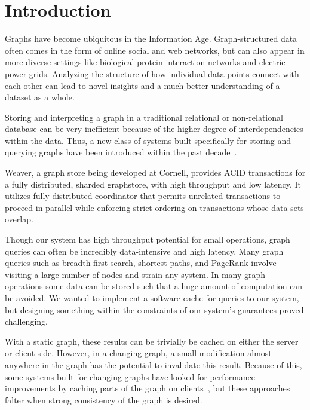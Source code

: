 \documentclass[letterpaper,twocolumn,11pt,tight]{article}
\begin{document}
\section{Introduction}\label{sec:intro}
Graphs have become ubiquitous in the Information Age. 
Graph-structured data often comes in the form of online social and web networks, but can
also appear in more diverse settings like biological protein interaction networks and electric power grids.
Analyzing the structure of how individual data points connect with each other can lead to novel insights and a much better understanding of a dataset as a whole.

Storing and interpreting a graph in a traditional relational or non-relational database can be very inefficient because of the higher degree of interdependencies within the data. Thus, a new class of systems built specifically for storing and querying graphs have been introduced within the past decade~\cite{giraph,tao,powergraph,pregel,memcache_fb,gps,trinity}.

Weaver, a graph store being developed at Cornell, provides ACID transactions for a fully distributed, sharded graphstore, with high throughput and low latency.
It utilizes fully-distributed coordinator that permits unrelated transactions to proceed in parallel while enforcing strict ordering on transactions whose data sets overlap.

Though our system has high throughput potential for small operations, graph queries can often be incredibly data-intensive and high latency. 
Many graph queries such as breadth-first search, shortest paths, and PageRank involve visiting a large number of nodes and strain any system.
In many graph operations some data can be stored such that a huge amount of computation can be avoided. We wanted to implement a software cache for queries to our 
system, but designing something within the constraints of our system's guarantees proved challenging.

With a static graph, these results can be trivially be cached on either the server or client side. However, in a changing graph, a small modification almost anywhere in the graph has the potential to invalidate this result. Because of this, some systems built for changing graphs have looked for performance improvements by caching parts of the graph on clients~\cite{titan}, but these approaches falter when strong consistency of the graph is desired.

\end{document}
